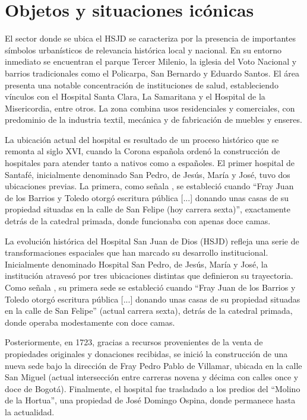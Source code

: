 \section{Objetos y situaciones icónicas}

El sector donde se ubica el HSJD se caracteriza por la presencia de importantes símbolos urbanísticos de relevancia histórica local y nacional. En su entorno inmediato se encuentran el parque Tercer Milenio, la iglesia del Voto Nacional y barrios tradicionales como el Policarpa, San Bernardo y Eduardo Santos. El área presenta una notable concentración de instituciones de salud, estableciendo vínculos con el Hospital Santa Clara, La Samaritana y el Hospital de la Misericordia, entre otros. La zona combina usos residenciales y comerciales, con predominio de la industria textil, mecánica y de fabricación de muebles y enseres.

La ubicación actual del hospital es resultado de un proceso histórico que se remonta al siglo XVI, cuando la Corona española ordenó la construcción de hospitales para atender tanto a nativos como a españoles. El primer hospital de Santafé, inicialmente denominado San Pedro, de Jesús, María y José, tuvo dos ubicaciones previas. La primera, como señala \parencite{Romero1994}, se estableció cuando \enquote{Fray Juan de los Barrios y Toledo otorgó escritura pública [...] donando unas casas de su propiedad situadas en la calle de San Felipe (hoy carrera sexta)}, exactamente detrás de la catedral primada, donde funcionaba con apenas doce camas.


La evolución histórica del Hospital San Juan de Dios (HSJD) refleja una serie de transformaciones espaciales que han marcado su desarrollo institucional. Inicialmente denominado Hospital San Pedro, de Jesús, María y José, la institución atravesó por tres ubicaciones distintas que definieron su trayectoria. Como señala \textcite{Romero1994}, su primera sede se estableció cuando \enquote{Fray Juan de los Barrios y Toledo otorgó escritura pública [...] donando unas casas de su propiedad situadas en la calle de San Felipe} (actual carrera sexta), detrás de la catedral primada, donde operaba modestamente con doce camas.

Posteriormente, en 1723, gracias a recursos provenientes de la venta de propiedades originales y donaciones recibidas, se inició la construcción de una nueva sede bajo la dirección de Fray Pedro Pablo de Villamar, ubicada en la calle San Miguel (actual intersección entre carreras novena y décima con calles once y doce de Bogotá). Finalmente, el hospital fue trasladado a los predios del \enquote{Molino de la Hortua}, una propiedad de José Domingo Ospina, donde permanece hasta la actualidad.

